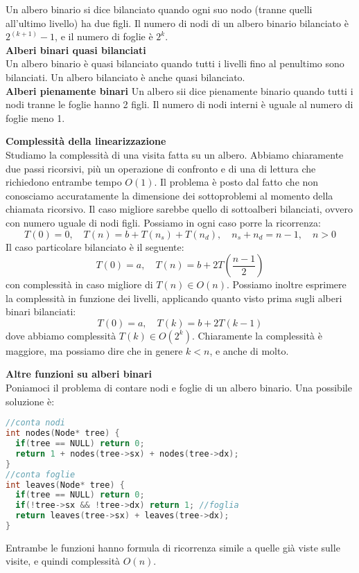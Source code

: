 \documentclass[a4paper,12pt]{article}
\begin{document}
Un albero binario si dice bilanciato quando ogni suo nodo (tranne quelli all'ultimo livello) ha due figli.
Il numero di nodi di un albero binario bilanciato è $2^{(k+1)}-1$, e il numero di foglie è $ 2^k$. \\
\textbf{Alberi binari quasi bilanciati} \\
Un albero binario è quasi bilanciato quando tutti i livelli fino al penultimo sono bilanciati. Un albero bilanciato
è anche quasi bilanciato. \\
\textbf{Alberi pienamente binari}
Un albero sii dice pienamente binario quando tutti i nodi tranne le foglie hanno 2 figli. Il numero di nodi interni
è uguale al numero di foglie meno 1.
\par\smallskip
\textbf{Complessità della linearizzazione} \\
Studiamo la complessità di una visita fatta su un albero. Abbiamo chiaramente due passi ricorsivi, più un operazione
di confronto e di una di lettura che richiedono entrambe tempo $O(1)$. Il problema è posto dal fatto che non conosciamo
accuratamente la dimensione dei sottoproblemi al momento della chiamata ricorsivo. Il caso migliore sarebbe quello di
sottoalberi bilanciati, ovvero con numero uguale di nodi figli. Possiamo in ogni caso porre la ricorrenza:
$$ T(0) = 0, \quad T(n) = b + T(n_s) + T(n_d), \quad n_s+n_d = n-1, \quad n > 0 $$
Il caso particolare bilanciato è il seguente:
$$ T(0) = a, \quad T(n) = b + 2T(\frac{n-1}{2}) $$
con complessità in caso migliore di $T(n) \in O(n)$. 
Possiamo inoltre esprimere la complessità in funzione dei livelli, applicando quanto visto prima sugli alberi binari bilanciati:
$$ T(0) = a, \quad T(k) = b+2T(k-1)$$
dove abbiamo complessità $T(k) \in O(2^k)$. Chiaramente la complessità è maggiore, ma possiamo dire che in genere $k < n$, e anche
di molto.
\par\smallskip
\textbf{Altre funzioni su alberi binari} \\
Poniamoci il problema di contare nodi e foglie di un albero binario. Una possibile soluzione è:
\begin{lstlisting}[language=C++]
//conta nodi
int nodes(Node* tree) {
  if(tree == NULL) return 0;
  return 1 + nodes(tree->sx) + nodes(tree->dx);
}
//conta foglie
int leaves(Node* tree) {
  if(tree == NULL) return 0;
  if(!tree->sx && !tree->dx) return 1; //foglia
  return leaves(tree->sx) + leaves(tree->dx);
}
\end{lstlisting}
Entrambe le funzioni hanno formula di ricorrenza simile a quelle già viste sulle visite, e quindi complessità $O(n)$.
\end{document}

